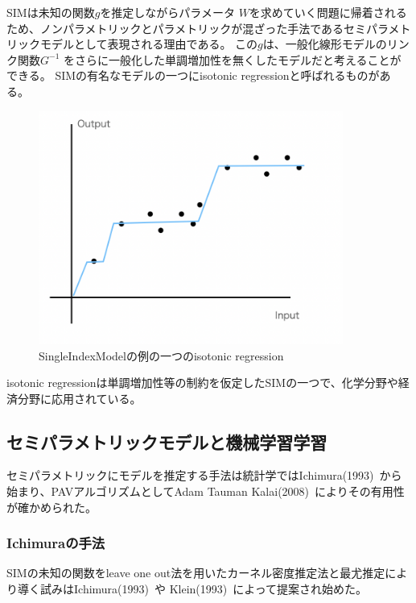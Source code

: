SIMは未知の関数$ g $を推定しながらパラメータ $ W $を求めていく問題に帰着されるため、ノンパラメトリックとパラメトリックが混ざった手法であるセミパラメトリックモデルとして表現される理由である。
この$ g $は、一般化線形モデルのリンク関数$ G^{-1} $ をさらに一般化した単調増加性を無くしたモデルだと考えることができる。
SIMの有名なモデルの一つにisotonic regressionと呼ばれるものがある。

\begin{figure}[hbtp]

    \begin{center}
        \includegraphics[width=10cm]{asset/isotonic_regression.png}
            \caption{SingleIndexModelの例の一つのisotonic regression}
            \label{isotonic_regression}
    \end{center}
\end{figure}

isotonic regressionは単調増加性等の制約を仮定したSIMの一つで、化学分野や経済分野に応用されている。


\subsection {セミパラメトリックモデルと機械学習学習}

セミパラメトリックにモデルを推定する手法は統計学ではIchimura(1993)~\cite{ichimura}から始まり、PAVアルゴリズムとしてAdam Tauman Kalai(2008)~\cite{isotron}によりその有用性が確かめられた。

\subsubsection{Ichimuraの手法}

SIMの未知の関数をleave one out法を用いたカーネル密度推定法と最尤推定により導く試みはIchimura(1993)~\cite{ichimura}や Klein(1993)~\cite{klein}によって提案され始めた。

